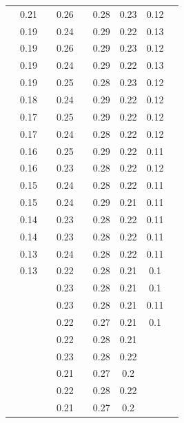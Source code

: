 \documentclass[AutoFakeBold]{LZUThesis}
\begin{document}
\begin{longtable}{ccccccccc}
      & 0.21  &       & 0.26  &       & 0.28  & 0.23 & 0.12 &       \\
      & 0.19  &       & 0.24  &       & 0.29  & 0.22 & 0.13 &       \\
      & 0.19  &       & 0.26  &       & 0.29  & 0.23 & 0.12 &       \\
      & 0.19  &       & 0.24  &       & 0.29  & 0.22 & 0.13 &       \\
      & 0.19  &       & 0.25  &       & 0.28  & 0.23 & 0.12 &       \\
      & 0.18  &       & 0.24  &       & 0.29  & 0.22 & 0.12 &       \\
      & 0.17  &       & 0.25  &       & 0.29  & 0.22 & 0.12 &       \\
      & 0.17  &       & 0.24  &       & 0.28  & 0.22 & 0.12 &       \\
      & 0.16  &       & 0.25  &       & 0.29  & 0.22 & 0.11 &       \\
      & 0.16  &       & 0.23  &       & 0.28  & 0.22 & 0.12 &       \\
      & 0.15  &       & 0.24  &       & 0.28  & 0.22 & 0.11 &       \\
      & 0.15  &       & 0.24  &       & 0.29  & 0.21 & 0.11 &       \\
      & 0.14  &       & 0.23  &       & 0.28  & 0.22 & 0.11 &       \\
      & 0.14  &       & 0.23  &       & 0.28  & 0.22 & 0.11 &       \\
      & 0.13  &       & 0.24  &       & 0.28  & 0.22 & 0.11 &       \\
      & 0.13  &       & 0.22  &       & 0.28  & 0.21 & 0.1  &       \\
      &       &       & 0.23  &       & 0.28  & 0.21 & 0.1  &       \\
      &       &       & 0.23  &       & 0.28  & 0.21 & 0.11 &       \\
      &       &       & 0.22  &       & 0.27  & 0.21 & 0.1  &       \\
      &       &       & 0.22  &       & 0.28  & 0.21 &      &       \\
      &       &       & 0.23  &       & 0.28  & 0.22 &      &       \\
      &       &       & 0.21  &       & 0.27  & 0.2  &      &       \\
      &       &       & 0.22  &       & 0.28  & 0.22 &      &       \\
      &       &       & 0.21  &       & 0.27  & 0.2  &      &       \\

\end{longtable}
\end{document}
